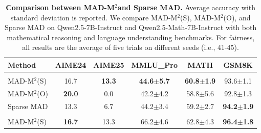 \documentclass{article} %
\newcommand{\methodname}{MAD-M$^2$}
\theoremstyle{plain}
\begin{document}
\begin{table}[t]
\caption{\textbf{Comparison between \methodname and Sparse MAD.} Average accuracy with standard deviation is reported. We compare \methodname (S), \methodname (O), and Sparse MAD on Qwen2.5-7B-Instruct and Qwen2.5-Math-7B-Instruct with both mathematical reasoning and language understanding benchmarks. For fairness, all results are the average of five trials on different seeds (i.e., 41-45).}
    \vspace{-8pt}
	\label{tab:comparison_sparse_mad}
	\begin{center}
		\begin{small}
		\setlength\tabcolsep{12pt}
			\begin{threeparttable}
				\begin{tabular}{lccccc}
					\toprule
                    Method & AIME24 & AIME25 & MMLU\_Pro & MATH & GSM8K\\
                    \midrule
                    \rowcolor{Gray}
                    \multicolumn{6}{c}{\texttt{Qwen2.5-7B-Instruct}} \\
                    \midrule
                    \methodname (S) & 16.7 & \textbf{13.3} & \textbf{44.6$\pm$5.7} & \textbf{60.8$\pm$1.9} & 93.6$\pm$1.1\\
                    \methodname (O) & \textbf{20.0} & 0.0 & 42.2$\pm$4.2 & 58.8$\pm$5.6 & 92.8$\pm$1.3\\
                    Sparse MAD & 13.3 & 6.7 & 44.2$\pm$3.4 & 59.2$\pm$2.7 & \textbf{94.2$\pm$1.9}\\
                    \midrule
                    \rowcolor{Gray}
                    \multicolumn{6}{c}{\texttt{Qwen2.5-Math-7B-Instruct}} \\
                    \midrule
                    \methodname (S) & \textbf{16.7} & 13.3 & 66.2$\pm$4.6 & 62.8$\pm$4.3 & \textbf{96.4$\pm$1.8}\\

\end{tabular}
\end{threeparttable}
\end{small}
\end{center}
\end{table}
\end{document}
